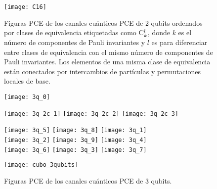 \begin{figure}[H]
	\begin{minipage}[b]{0.49\textwidth}
	\centering
		\texttt{[image: C16]}
	\end{minipage}
	\caption{Figuras PCE de los canales cuánticos PCE de 2 qubits ordenados por 
	clases de equivalencia etiquetadas como C${}_{k}^{l}$, donde $k$ es el número 
	de componentes de Pauli invariantes y $l$ es para diferenciar entre clases 
	de equivalencia con el mismo número de componentes de Pauli invariantes.
	Los elementos de una misma clase de equivalencia están conectados por 
	intercambios de partículas y permutaciones locales de base. \ep}
	\label{fig:2qubits_PCEChannels_figs}
\end{figure} 
\begin{figure}[H]
	\centering
	\vspace{-.5cm}
	\begin{minipage}[t]{.9\textwidth}
		\centering
		\texttt{[image: 3q\_0]}
		\vspace{-.5cm} 
		\vspace{-.5cm}
	\end{minipage}
	\begin{minipage}[t]{.9\textwidth}
		\centering
		\texttt{[image: 3q\_2c\_1]} \hfill
		\texttt{[image: 3q\_2c\_2]} \hfill
		\texttt{[image: 3q\_2c\_3]}
		\vspace{-.5cm} 
		 \vspace{-.5cm}
	\end{minipage}
	\begin{minipage}[t]{.9\textwidth}
		\centering
		\texttt{[image: 3q\_5]} \hfill
		\texttt{[image: 3q\_8]} \hfill
		\texttt{[image: 3q\_1]} \\ \vspace{-1cm} 
		\texttt{[image: 3q\_2]} \hfill
		\texttt{[image: 3q\_9]} \hfill
		\texttt{[image: 3q\_4]}  \\ \vspace{-1cm} 
		\texttt{[image: 3q\_6]} \hfill
		\texttt{[image: 3q\_3]} \hfill
		\texttt{[image: 3q\_7]} 
		\vspace{-.5cm} 
	\end{minipage}
	\begin{minipage}[t]{.9\textwidth}
		\centering
		\texttt{[image: cubo\_3qubits]}
	\end{minipage}
	\caption{Figuras PCE de los canales cuánticos PCE de 3 qubits. \ep}
	\label{fig:3qubits_PCEChannels_figs}
\end{figure}

